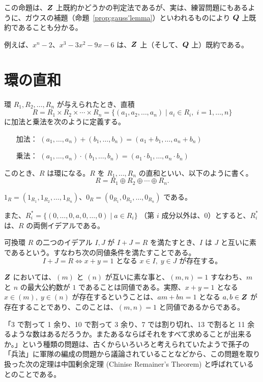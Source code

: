 \medskip
\note 
この命題は、$\mbox{\boldmath $Z$}$ 上既約かどうかの判定法であるが、実は、練習問題にもあるように、ガウスの補題（命題~\ref{prop:gauss'lemma}）といわれるものにより $\mbox{\boldmath $Q$}$ 上既約であることも分かる。

例えば、$x^n - 2$、$x^3 - 3x^2 - 9x -6$ は、$\mbox{\boldmath $Z$}$ 上（そして、$\mbox{\boldmath $Q$}$ 上）既約である。

\newpage
\section{環の直和}
\begin{definition}
環 $R_1, R_2, \ldots, R_n$ が与えられたとき、直積
$$R = R_1\times R_2 \times \cdots \times R_n = \{(a_1,a_2,\ldots, a_n)\mid a_i\in R_i,\;i = 1,\ldots, n\}$$
に加法と乗法を次のように定義する。
\begin{itemize}
\item[加法：] $(a_1,\ldots, a_n) + (b_1,\ldots,b_n) = (a_1 + b_1,\ldots, a_n+b_n)$
\item[乗法：] $(a_1,\ldots, a_n) \cdot (b_1,\ldots,b_n) = (a_1\cdot b_1,\ldots, a_n\cdot b_n)$
\end{itemize}
このとき、$R$ は環になる。$R$ を $R_1,\ldots, R_n$ の直和といい、以下のように書く。
$$R = R_1\oplus R_2 \oplus \cdots \oplus R_n.$$
\end{definition}

\note
$1_R = (1_{R_1},1_{R_2},\ldots, 1_{R_n})$、$0_R = (0_{R_1},0_{R_2},\ldots, 0_{R_n})$ である。

また、$R_i^* = \{(0,\ldots, 0,a,0,\ldots, 0)\mid a\in R_i\}$ （第 $i$ 成分以外は、$0$）とすると、$R_i^*$  は、$R$ の両側イデアルである。

\medskip
可換環 $R$ の二つのイデアル $I,J$ が $I+J = R$ を満たすとき、$I$ は $J$ と互いに素であるという。すなわち次の同値条件を満たすことである。
$$I+J = R\Leftrightarrow x+y = 1\mbox{ となる }x\in I, \;y\in J \mbox{ が存在する。}$$

\medskip
$\mbox{\boldmath $Z$}$ においては、$(m)$ と $(n)$  が互いに素な事と、$(m,n) = 1$ すなわち、$m$ と $n$ の最大公約数が $1$ であることは同値である。実際、$x+y = 1$ となる $x\in (m), \;y\in (n)$  が存在するということは、$am+bn = 1$ となる $a,b\in\mbox{\boldmath $Z$}$ が存在することであり、このことは、$(m,n) = 1$  と同値であるからである。

\medskip
「3 で割って 1 余り、10 で割って 3 余り、7 では割り切れ、13 で割ると 11 余るような数はあるだろうか。またあるならばそれをすべて求めることが出来るか。」という種類の問題は、古くからいろいろと考えられていたようで孫子の「兵法」に軍隊の編成の問題から議論されていることなどから、この問題を取り扱った次の定理は中国剰余定理 (Chinise Remainer's Theorem) と呼ばれているとのことである。

